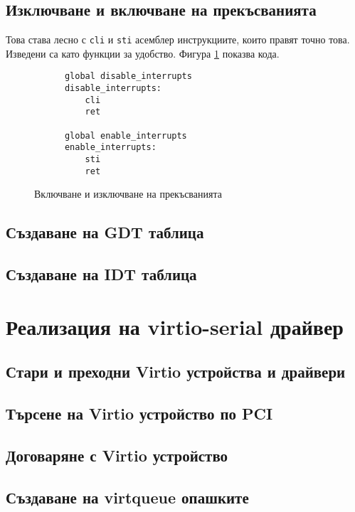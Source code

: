   \subsection{Изключване и включване на прекъсванията}
  Това става лесно с {\tt cli} и {\tt sti} асемблер инструкциите, които правят точно това. Изведени са като функции за удобство. Фигура \ref{fig:interrupt-disable} показва кода.

  \begin{figure}[ht]
    \centering
    \caption{Включване и изключване на прекъсванията}
    \begin{verbatim}
      global disable_interrupts
      disable_interrupts:
          cli
          ret

      global enable_interrupts
      enable_interrupts:
          sti
          ret
    \end{verbatim}
    \label{fig:interrupt-disable}
  \end{figure}

  \subsection{Създаване на GDT таблица}

  \subsection{Създаване на IDT таблица}

\section{Реализация на virtio-serial драйвер}
  \subsection{Стари и преходни Virtio устройства и драйвери}

  \subsection{Търсене на Virtio устройство по PCI}

  \subsection{Договаряне с Virtio устройство}

  \subsection{Създаване на virtqueue опашките}

